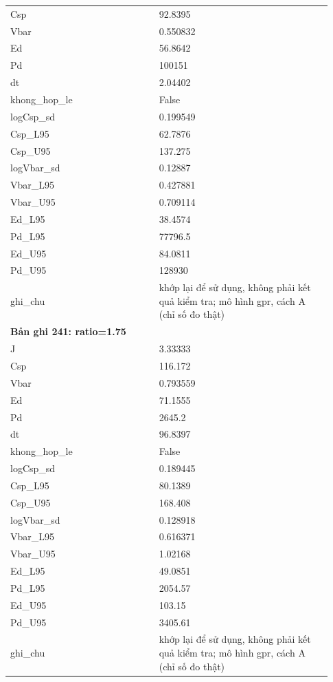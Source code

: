 \begin{longtable}{p{0.43\linewidth}p{0.50\linewidth}}
Csp & 92.8395 \\
Vbar & 0.550832 \\
Ed & 56.8642 \\
Pd & 100151 \\
dt & 2.04402 \\
khong\_\allowbreak hop\_\allowbreak le & False \\
logCsp\_\allowbreak sd & 0.199549 \\
Csp\_\allowbreak L95 & 62.7876 \\
Csp\_\allowbreak U95 & 137.275 \\
logVbar\_\allowbreak sd & 0.12887 \\
Vbar\_\allowbreak L95 & 0.427881 \\
Vbar\_\allowbreak U95 & 0.709114 \\
Ed\_\allowbreak L95 & 38.4574 \\
Pd\_\allowbreak L95 & 77796.5 \\
Ed\_\allowbreak U95 & 84.0811 \\
Pd\_\allowbreak U95 & 128930 \\
ghi\_\allowbreak chu & khớp lại để sử dụng, không phải kết quả kiểm tra; mô hình gpr, cách A (chỉ số đo thật) \\
\midrule
\multicolumn{2}{p{0.95\linewidth}}{\textbf{Bản ghi 241: ratio=1.75}} \\
J & 3.33333 \\
Csp & 116.172 \\
Vbar & 0.793559 \\
Ed & 71.1555 \\
Pd & 2645.2 \\
dt & 96.8397 \\
khong\_\allowbreak hop\_\allowbreak le & False \\
logCsp\_\allowbreak sd & 0.189445 \\
Csp\_\allowbreak L95 & 80.1389 \\
Csp\_\allowbreak U95 & 168.408 \\
logVbar\_\allowbreak sd & 0.128918 \\
Vbar\_\allowbreak L95 & 0.616371 \\
Vbar\_\allowbreak U95 & 1.02168 \\
Ed\_\allowbreak L95 & 49.0851 \\
Pd\_\allowbreak L95 & 2054.57 \\
Ed\_\allowbreak U95 & 103.15 \\
Pd\_\allowbreak U95 & 3405.61 \\
ghi\_\allowbreak chu & khớp lại để sử dụng, không phải kết quả kiểm tra; mô hình gpr, cách A (chỉ số đo thật) \\

\end{longtable}
